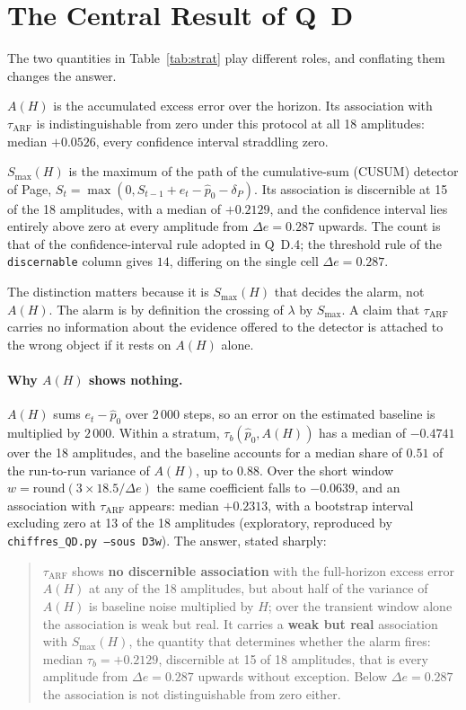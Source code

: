 \documentclass[11pt,a4paper]{article}
\begin{document}
\section{The Central Result of Q~D}

The two quantities in Table~\ref{tab:strat} play different roles, and conflating them
changes the answer.

$A(H)$ is the accumulated excess error over the horizon. Its association with
$\tau_{\mathrm{ARF}}$ is indistinguishable from zero under this protocol at all
18 amplitudes: median $+0.0526$, every confidence interval straddling zero.

$S_{\max}(H)$ is the maximum of the path of the cumulative-sum (CUSUM) detector of Page,
$S_t = \max(0, S_{t-1} + e_t - \hat p_0 - \delta_P)$. Its association is discernible at 15 of the
18 amplitudes, with a median of $+0.2129$, and the confidence interval lies entirely above
zero at every amplitude from $\Delta e = 0.287$ upwards. The count is that of the
confidence-interval rule adopted in Q~D.4; the threshold rule of the \texttt{discernable}
column gives $14$, differing on the single cell $\Delta e = 0.287$.

The distinction matters because it is $S_{\max}(H)$ that decides the alarm, not $A(H)$. The
alarm is by definition the crossing of $\lambda$ by $S_{\max}$. A claim that
$\tau_{\mathrm{ARF}}$ carries no information about the evidence offered to the detector is
attached to the wrong object if it rests on $A(H)$ alone.

\paragraph{Why $A(H)$ shows nothing.} $A(H)$ sums $e_t - \hat p_0$ over $2\,000$ steps, so an
error on the estimated baseline is multiplied by $2\,000$. Within a stratum,
$\tau_b(\hat p_0, A(H))$ has a median of $-0.4741$ over the 18 amplitudes, and the baseline
accounts for a median share of $0.51$ of the run-to-run variance of $A(H)$, up to $0.88$.
Over the short window $w = \mathrm{round}(3 \times 18.5/\Delta e)$ the same coefficient falls to
$-0.0639$, and an association with $\tau_{\mathrm{ARF}}$ appears: median $+0.2313$, with a
bootstrap interval excluding zero at 13 of the 18 amplitudes (exploratory, reproduced by
\texttt{chiffres\_QD.py --sous D3w}). The answer, stated sharply:

\begin{quote}
$\tau_{\mathrm{ARF}}$ shows \textbf{no discernible association} with the full-horizon
excess error $A(H)$ at any of the 18 amplitudes, but about half of the variance of $A(H)$ is
baseline noise multiplied by $H$; over the transient window alone the association is weak
but real. It carries a \textbf{weak
but real} association with $S_{\max}(H)$, the quantity that determines whether the alarm
fires: median $\tau_b = +0.2129$, discernible at 15 of 18 amplitudes, that is every
amplitude from $\Delta e = 0.287$ upwards without exception. Below $\Delta e = 0.287$ the
association is not distinguishable from zero either.
\end{quote}
\end{document}

